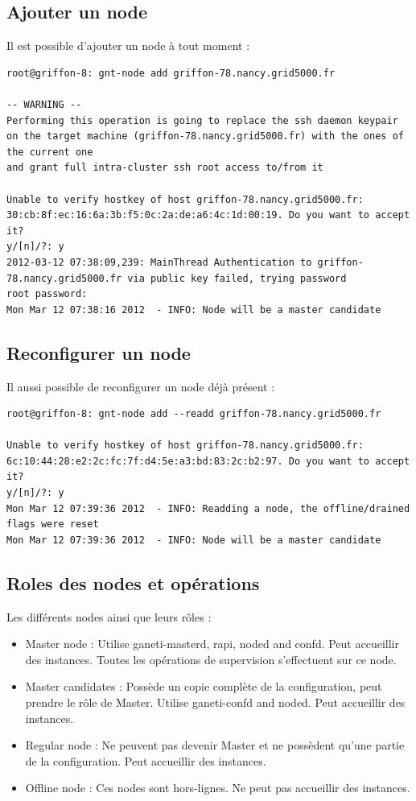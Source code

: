 \subsection {Ajouter un node}
Il est possible d'ajouter un node à tout moment :
\begin{lstlisting}
root@griffon-8: gnt-node add griffon-78.nancy.grid5000.fr

-- WARNING -- 
Performing this operation is going to replace the ssh daemon keypair
on the target machine (griffon-78.nancy.grid5000.fr) with the ones of the current one
and grant full intra-cluster ssh root access to/from it

Unable to verify hostkey of host griffon-78.nancy.grid5000.fr:
30:cb:8f:ec:16:6a:3b:f5:0c:2a:de:a6:4c:1d:00:19. Do you want to accept
it?
y/[n]/?: y
2012-03-12 07:38:09,239: MainThread Authentication to griffon-78.nancy.grid5000.fr via public key failed, trying password
root password:
Mon Mar 12 07:38:16 2012  - INFO: Node will be a master candidate
\end{lstlisting}
\subsection{Reconfigurer un node}
Il aussi possible de reconfigurer un node déjà présent :
\begin{lstlisting}
root@griffon-8: gnt-node add --readd griffon-78.nancy.grid5000.fr

Unable to verify hostkey of host griffon-78.nancy.grid5000.fr:
6c:10:44:28:e2:2c:fc:7f:d4:5e:a3:bd:83:2c:b2:97. Do you want to accept
it?
y/[n]/?: y
Mon Mar 12 07:39:36 2012  - INFO: Readding a node, the offline/drained flags were reset
Mon Mar 12 07:39:36 2012  - INFO: Node will be a master candidate
\end{lstlisting}

\subsection {Roles des nodes et opérations}
Les différents nodes ainsi que leurs rôles :
\begin{itemize}
\item Master node : Utilise ganeti-masterd, rapi, noded and confd. Peut accueillir des instances. Toutes les opérations de supervision s'effectuent sur ce node.
\item Master candidates : Possède un copie complète de la configuration, peut prendre le rôle de Master. Utilise ganeti-confd and noded. Peut accueillir des instances.
\item Regular node : Ne peuvent pas devenir Master et ne possèdent qu'une partie de la configuration. Peut accueillir des instances.
\item Offline node : Ces nodes sont hors-lignes. Ne peut pas accueillir des instances.
\end{itemize}
